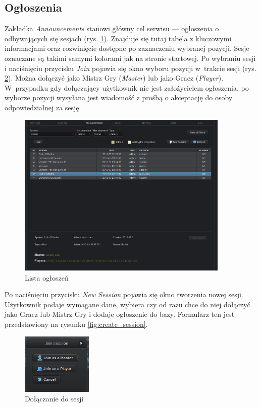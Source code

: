 \clearpage
\subsection*{Ogłoszenia}
\label{sec:sessions}
\hspace{15pt}Zakładka \emph{Announcements} stanowi główny cel serwisu --- ogłoszenia o odbywających się sesjach (rys. \ref{fig:sessions}).  Znajduje się tutaj tabela z kluczowymi informacjami oraz rozwinięcie dostępne po zaznaczeniu wybranej pozycji. Sesje oznaczane są takimi samymi kolorami jak na stronie startowej. Po wybraniu sesji i naciśnięciu przycisku \emph{Join} pojawia się okno wyboru pozycji w~trakcie sesji (rys. \ref{fig:join_session}). Można dołączyć jako Mistrz Gry (\emph{Master}) lub jako Gracz (\emph{Player}). W~przypadku gdy dołączający użytkownik nie jest założycielem ogłoszenia, po wyborze pozycji wysyłana jest wiadomość z prośbą o akceptację do osoby odpowiedzialnej za sesję. 

\begin{figure}[h!]
\centering
\includegraphics[width=0.9\textwidth]{./img/interfejsy/sessions}
\caption{Lista ogłoszeń}
\label{fig:sessions}
\end{figure}

\hspace{15pt}Po naciśnięciu przycisku \emph{New Session} pojawia się okno tworzenia nowej sesji. Użytkownik podaje wymagane dane, wybiera czy od razu chce do niej dołączyć jako Gracz lub Mistrz Gry i dodaje ogłoszenie do bazy. Formularz ten jest przedstawiony na rysunku \ref{fig:create_session}.

\begin{figure}[h!]
\centering
\includegraphics[width=0.3\textwidth]{./img/interfejsy/join_session}
\caption{Dołączanie do sesji}
\label{fig:join_session}
\end{figure}

